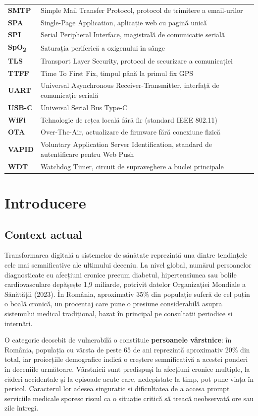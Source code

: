 ﻿\documentclass[12pt,a4paper,twoside]{article}
\newcommand{\spo}{SpO\textsubscript{2}}
\begin{document}
{\begin{longtable}{@{}>{\bfseries}p{2.7cm}p{10.6cm}@{}}
SMTP & Simple Mail Transfer Protocol, protocol de trimitere a email-urilor\\
SPA & Single-Page Application, aplicație web cu pagină unică\\
SPI & Serial Peripheral Interface, magistrală de comunicație serială\\
\spo & Saturația periferică a oxigenului în sânge\\
TLS & Transport Layer Security, protocol de securizare a comunicației\\
TTFF & Time To First Fix, timpul până la primul fix GPS\\
UART & Universal Asynchronous Receiver-Transmitter, interfață de comunicație serială\\
USB-C & Universal Serial Bus Type-C\\
WiFi & Tehnologie de rețea locală fără fir (standard IEEE 802.11)\\
OTA & Over-The-Air, actualizare de firmware fără conexiune fizică\\
VAPID & Voluntary Application Server Identification, standard de autentificare pentru Web Push\\
WDT & Watchdog Timer, circuit de supraveghere a buclei principale\\
\end{longtable}
}
\addtocounter{table}{-1}

\newpage

\section{Introducere}

\subsection{Context actual}

Transformarea digitală a sistemelor de sănătate reprezintă una dintre tendințele cele mai semnificative ale ultimului deceniu. La nivel global, numărul persoanelor diagnosticate cu afecțiuni cronice precum diabetul, hipertensiunea sau bolile cardiovasculare depășește 1,9 miliarde, potrivit datelor Organizației Mondiale a Sănătății (2023). În România, aproximativ 35\% din populație suferă de cel puțin o boală cronică, un procentaj care pune o presiune considerabilă asupra sistemului medical tradițional, bazat în principal pe consultații periodice și internări.

O categorie deosebit de vulnerabilă o constituie \textbf{persoanele vârstnice}: în România, populația cu vârsta de peste 65 de ani reprezintă aproximativ 20\% din total, iar proiecțiile demografice indică o creștere semnificativă a acestei ponderi în deceniile următoare. Vârstnicii sunt predispuși la afecțiuni cronice multiple, la căderi accidentale și la episoade acute care, nedepistate la timp, pot pune viața în pericol. Caracterul lor adesea singuratic și dificultatea de a accesa prompt serviciile medicale sporesc riscul ca o situație critică să treacă neobservată ore sau zile întregi.
\end{document}
